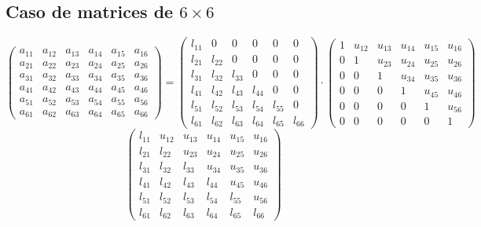 \documentclass[10pt,a4paper,dvipdfmx]{article}
\begin{document}
\subsection{Caso de matrices de $6\times 6$ }
$$ \left( 
\begin{array}{cccccc}
a_{{1}{1}} & a_{{1}{2}} & a_{{1}{3}} & a_{{1}{4}} & a_{{1}{5}} & a_{{1}{6}} \\
a_{{2}{1}} & a_{{2}{2}} & a_{{2}{3}} & a_{{2}{4}} & a_{{2}{5}} & a_{{2}{6}} \\
a_{{3}{1}} & a_{{3}{2}} & a_{{3}{3}} & a_{{3}{4}} & a_{{3}{5}} & a_{{3}{6}} \\
a_{{4}{1}} & a_{{4}{2}} & a_{{4}{3}} & a_{{4}{4}} & a_{{4}{5}} & a_{{4}{6}} \\
a_{{5}{1}} & a_{{5}{2}} & a_{{5}{3}} & a_{{5}{4}} & a_{{5}{5}} & a_{{5}{6}} \\
a_{{6}{1}} & a_{{6}{2}} & a_{{6}{3}} & a_{{6}{4}} & a_{{6}{5}} & a_{{6}{6}} 
 \end{array}
\right)
 = \left( 
\begin{array}{cccccc}
l_{{1}{1}} & 0 & 0 & 0 & 0 & 0 \\
l_{{2}{1}} & l_{{2}{2}} & 0 & 0 & 0 & 0 \\
l_{{3}{1}} & l_{{3}{2}} & l_{{3}{3}} & 0 & 0 & 0 \\
l_{{4}{1}} & l_{{4}{2}} & l_{{4}{3}} & l_{{4}{4}} & 0 & 0 \\
l_{{5}{1}} & l_{{5}{2}} & l_{{5}{3}} & l_{{5}{4}} & l_{{5}{5}} & 0 \\
l_{{6}{1}} & l_{{6}{2}} & l_{{6}{3}} & l_{{6}{4}} & l_{{6}{5}} & l_{{6}{6}} 
 \end{array}
\right)
 \cdot \left( 
\begin{array}{cccccc}
1 & u_{{1}{2}} & u_{{1}{3}} & u_{{1}{4}} & u_{{1}{5}} & u_{{1}{6}} \\
0 & 1 & u_{{2}{3}} & u_{{2}{4}} & u_{{2}{5}} & u_{{2}{6}} \\
0 & 0 & 1 & u_{{3}{4}} & u_{{3}{5}} & u_{{3}{6}} \\
0 & 0 & 0 & 1 & u_{{4}{5}} & u_{{4}{6}} \\
0 & 0 & 0 & 0 & 1 & u_{{5}{6}} \\
0 & 0 & 0 & 0 & 0 & 1 
 \end{array}
\right)
 $$
$$ \left( 
\begin{array}{cccccc}
l_{{1}{1}} & u_{{1}{2}} & u_{{1}{3}} & u_{{1}{4}} & u_{{1}{5}} & u_{{1}{6}} \\
l_{{2}{1}} & l_{{2}{2}} & u_{{2}{3}} & u_{{2}{4}} & u_{{2}{5}} & u_{{2}{6}} \\
l_{{3}{1}} & l_{{3}{2}} & l_{{3}{3}} & u_{{3}{4}} & u_{{3}{5}} & u_{{3}{6}} \\
l_{{4}{1}} & l_{{4}{2}} & l_{{4}{3}} & l_{{4}{4}} & u_{{4}{5}} & u_{{4}{6}} \\
l_{{5}{1}} & l_{{5}{2}} & l_{{5}{3}} & l_{{5}{4}} & l_{{5}{5}} & u_{{5}{6}} \\
l_{{6}{1}} & l_{{6}{2}} & l_{{6}{3}} & l_{{6}{4}} & l_{{6}{5}} & l_{{6}{6}} 
 \end{array}
\right)
 $$
\end{document}
